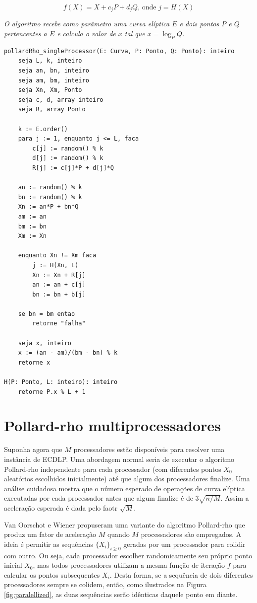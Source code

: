 \begin{equation*}
f(X) = X + c_jP + d_jQ \textrm{, onde } j = H(X)
\end{equation*}

\textit{O algoritmo recebe como parâmetro uma curva elíptica \(E\) e dois pontos \(P\) e \(Q\) pertencentes a \(E\) e calcula o valor de \(x\) tal que $x = \log_P Q$.}

% 
%
\begin{lstlisting}[caption={Algoritmo Pollard-rho com único processador.},label=single_processor]
pollardRho_singleProcessor(E: Curva, P: Ponto, Q: Ponto): inteiro
	seja L, k, inteiro
	seja an, bn, inteiro
	seja am, bm, inteiro
	seja Xn, Xm, Ponto
	seja c, d, array inteiro
	seja R, array Ponto

	k := E.order()
	para j := 1, enquanto j <= L, faca
		c[j] := random() % k
		d[j] := random() % k
		R[j] := c[j]*P + d[j]*Q

	an := random() % k
	bn := random() % k
	Xn := an*P + bn*Q
	am := an
	bm := bn
	Xm := Xn

	enquanto Xn != Xm faca
		j := H(Xn, L)
		Xn := Xn + R[j]
		an := an + c[j]
		bn := bn + b[j]

	se bn = bm entao
		retorne "falha"

	seja x, inteiro
	x := (an - am)/(bm - bn) % k
	retorne x

H(P: Ponto, L: inteiro): inteiro
	retorne P.x % L + 1

\end{lstlisting}

%
%
\section{Pollard-rho multiprocessadores}
Suponha agora que \(M\) processadores estão disponíveis para resolver uma instância de ECDLP. Uma abordagem normal seria de executar o algoritmo Pollard-rho independente para cada processador (com diferentes pontos \(X_0\) aleatórios escolhidos inicialmente) até que algum dos processadores finalize. Uma análise cuidadosa mostra que o número esperado de operações de curva elíptica executadas por cada processador antes que algum finalize é de $3\sqrt{n/M}$. Assim a aceleração esperada é dada pelo faotr $\sqrt{M}$.

Van Oorschot e Wiener propuseram uma variante do algoritmo Pollard-rho que produz um fator de aceleração \(M\) quando \(M\) processadores são empregados. A ideia é permitir as sequências $\{X_i\}_{i \geq 0}$ geradas por um processador para colidir com outro. Ou seja, cada processador escolher randomicamente seu próprio ponto inicial \(X_0\), mas todos processadores utilizam a mesma função de iteração \(f\) para calcular os pontos subsequentes \(X_i\). Desta forma, se a sequência de dois diferentes processadores sempre se colidem, então, como ilustrados na Figura \ref{fig:paralellized}, as duas sequências serão idênticas daquele ponto em diante.

